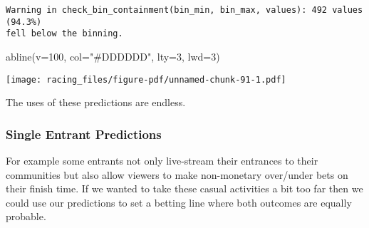 \documentclass[
  letterpaper,
  DIV=11,
  numbers=noendperiod]{scrartcl}
\newenvironment{Shaded}{\begin{snugshade}}{\end{snugshade}}
\newcommand{\AttributeTok}[1]{\textcolor[rgb]{0.40,0.45,0.13}{#1}}
\newcommand{\DecValTok}[1]{\textcolor[rgb]{0.68,0.00,0.00}{#1}}
\newcommand{\FunctionTok}[1]{\textcolor[rgb]{0.28,0.35,0.67}{#1}}
\newcommand{\NormalTok}[1]{\textcolor[rgb]{0.00,0.23,0.31}{#1}}
\newcommand{\OtherTok}[1]{\textcolor[rgb]{0.00,0.23,0.31}{#1}}
\newcommand{\SpecialCharTok}[1]{\textcolor[rgb]{0.37,0.37,0.37}{#1}}
\newcommand{\StringTok}[1]{\textcolor[rgb]{0.13,0.47,0.30}{#1}}
\begin{document}
\begin{Shaded}
\end{Shaded}

\begin{verbatim}
Warning in check_bin_containment(bin_min, bin_max, values): 492 values (94.3%)
fell below the binning.
\end{verbatim}

\begin{Shaded}
\begin{Highlighting}[]
\FunctionTok{abline}\NormalTok{(}\AttributeTok{v=}\DecValTok{100}\NormalTok{, }\AttributeTok{col=}\StringTok{"\#DDDDDD"}\NormalTok{, }\AttributeTok{lty=}\DecValTok{3}\NormalTok{, }\AttributeTok{lwd=}\DecValTok{3}\NormalTok{)}
\end{Highlighting}
\end{Shaded}

\texttt{[image: racing\_files/figure-pdf/unnamed-chunk-91-1.pdf]}

The uses of these predictions are endless.

\subsubsection{Single Entrant
Predictions}\label{single-entrant-predictions}

For example some entrants not only live-stream their entrances to their
communities but also allow viewers to make non-monetary over/under bets
on their finish time. If we wanted to take these casual activities a bit
too far then we could use our predictions to set a betting line where
both outcomes are equally probable.
\end{document}
